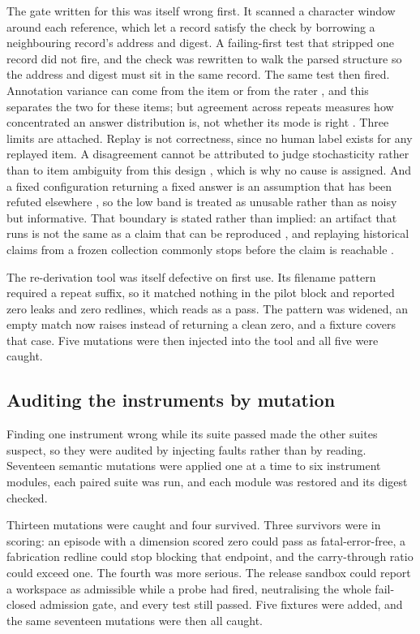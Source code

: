 \documentclass[11pt,a4paper]{article}
\begin{document}
The gate written for this was itself wrong first. It scanned a character window around
each reference, which let a record satisfy the check by borrowing a neighbouring record's
address and digest. A failing-first test that stripped one record did not fire, and the
check was rewritten to walk the parsed structure so the address and digest must sit in
the same record. The same test then fired. Annotation variance
can come from the item or from the rater \citep{annotationvariance2026}, and this
separates the two for these items; but agreement across repeats measures how
concentrated an answer distribution is, not whether its mode is right
\citep{agreementcorrectness2026}. Three limits are attached. Replay is not correctness, since no human
label exists for any replayed item. A disagreement cannot be attributed to judge
stochasticity rather than to item ambiguity from this design
\citep{judgeidentification2026}, which is why no cause is assigned. And a fixed
configuration returning a fixed answer is an assumption that has been refuted elsewhere
\citep{repeataudit2026}, so the low band is treated as unusable rather than as noisy but
informative. That boundary is stated rather than
implied: an artifact that runs is not the same as a claim that can be reproduced
\citep{runnableverifiable2026}, and replaying historical claims from a frozen collection
commonly stops before the claim is reachable \citep{claimreplay2026}.

The re-derivation tool was itself defective on first use. Its filename pattern required
a repeat suffix, so it matched nothing in the pilot block and reported zero leaks and
zero redlines, which reads as a pass. The pattern was widened, an empty match now raises
instead of returning a clean zero, and a fixture covers that case. Five mutations were
then injected into the tool and all five were caught.

\subsection{Auditing the instruments by mutation}

Finding one instrument wrong while its suite passed made the other suites suspect, so
they were audited by injecting faults rather than by reading. Seventeen semantic
mutations were applied one at a time to six instrument modules, each paired suite was
run, and each module was restored and its digest checked.

Thirteen mutations were caught and four survived. Three survivors were in scoring: an
episode with a dimension scored zero could pass as fatal-error-free, a fabrication
redline could stop blocking that endpoint, and the carry-through ratio could exceed one.
The fourth was more serious. The release sandbox could report a workspace as admissible
while a probe had fired, neutralising the whole fail-closed admission gate, and every
test still passed. Five fixtures were added, and the same seventeen mutations were then
all caught.
\end{document}
